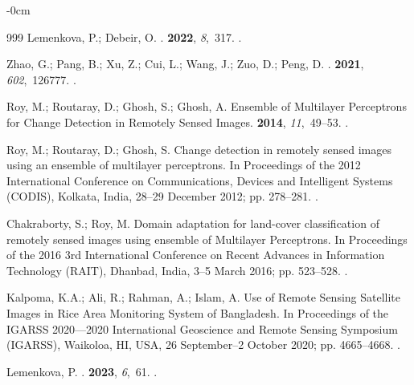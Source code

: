 \documentclass[water,article,accept,pdftex,oneauhor]{Definitions/mdpi}
\begin{document}
{{{\begin{adjustwidth}{-\extralength}{0cm}
\begin{thebibliography}{999}
Lemenkova, P.; Debeir, O.
.
 {\bf 2022}, {\em 8},~317.
.

Zhao, G.; Pang, B.; Xu, Z.; Cui, L.; Wang, J.; Zuo, D.; Peng, D.
.
 {\bf 2021}, {\em 602},~126777.
.

Roy, M.; Routaray, D.; Ghosh, S.; Ghosh, A.
\newblock Ensemble of Multilayer Perceptrons for Change Detection in Remotely
  Sensed Images.
 {\bf 2014}, {\em 11},~49--53.
.

Roy, M.; Routaray, D.; Ghosh, S.
\newblock Change detection in remotely sensed images using an ensemble of
  multilayer perceptrons.
\newblock In Proceedings of the 2012 International Conference on
  Communications, Devices and Intelligent Systems (CODIS), Kolkata, India, 28--29 December  2012; pp. 278--281.
.

Chakraborty, S.; Roy, M.
\newblock Domain adaptation for land-cover classification of remotely sensed
  images using ensemble of Multilayer Perceptrons.
\newblock In Proceedings of the 2016 3rd International Conference on Recent
  Advances in Information Technology (RAIT), Dhanbad, India, 3--5 March 2016; pp. 523--528.
.

Kalpoma, K.A.; Ali, R.; Rahman, A.; Islam, A.
\newblock Use of Remote Sensing Satellite Images in Rice Area Monitoring System
  of Bangladesh.
\newblock In Proceedings of the IGARSS 2020---2020 International Geoscience and Remote Sensing Symposium
  (IGARSS), Waikoloa, HI, USA, 26 September--2 October 2020; pp. 4665--4668.
.

Lemenkova, P.
.
 {\bf 2023}, {\em 6},~61.
.


\end{thebibliography}
\end{adjustwidth}}}}
\end{document}
